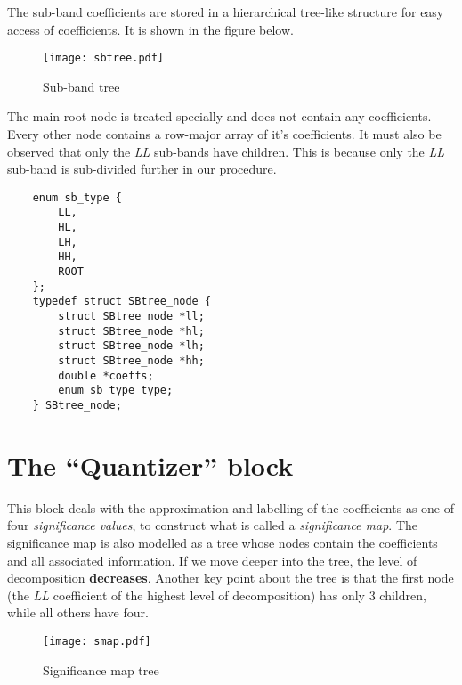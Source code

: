 \documentclass[./A14_Report.tex]{subfiles}
\begin{document}
\pagebreak

The sub-band coefficients are stored in a hierarchical tree-like structure for
easy access of coefficients. It is shown in the figure below.

\begin{figure}[H]
    \centering
    \texttt{[image: sbtree.pdf]}
    \caption{Sub-band tree}
    \label{fig:sbtreediag}
\end{figure}

The main root node is treated specially and does not contain any coefficients.
Every other node contains a row-major array of it's coefficients. It must also
be observed that only the \textit{LL} sub-bands have children. This is because
only the \textit{LL} sub-band is sub-divided further in our procedure.
\begin{code}
    \begin{verbatim}
    enum sb_type {
        LL,
        HL,
        LH,
        HH,
        ROOT
    };
    typedef struct SBtree_node {
        struct SBtree_node *ll;
        struct SBtree_node *hl;
        struct SBtree_node *lh;
        struct SBtree_node *hh;
        double *coeffs;
        enum sb_type type;
    } SBtree_node;
    \end{verbatim}
    \caption{\texttt{C struct} representation of the tree shown in figure \ref{fig:sbtreediag}}
    \label{code:sbtreedef}
\end{code}

\section{The ``Quantizer'' block}
This block deals with the approximation and labelling of the coefficients as
one of four \textit{significance values}, to construct what is called a
\textit{significance map}. The significance map is also modelled as a tree
whose nodes contain the coefficients and all associated information. If we move
deeper into the tree, the level of decomposition \textbf{decreases}. Another
key point about the tree is that the first node (the \textit{LL} coefficient of
the highest level of decomposition) has only 3 children, while all others have
four. %

\begin{figure}[H]
    \centering
    \texttt{[image: smap.pdf]}
    \caption{Significance map tree}
    \label{fig:smaptreediag}
\end{figure}
\end{document}
